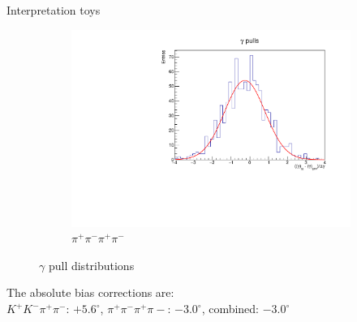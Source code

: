 \documentclass{beamer}
\begin{document}
\begin{frame}{Interpretation toys}
\begin{figure}
\begin{subfigure}{0.5\textwidth}
      \includegraphics[width=1.0\textwidth]{Plots/gamma_pull_toys_pipipipi.pdf}
      \vspace{-0.3cm}
      \caption*{$\pi^+\pi^-\pi^+\pi^-$}
    \end{subfigure}
    \vspace{-0.5cm}
    \caption*{$\gamma$ pull distributions}
  \end{figure}
  \vspace{-0.3cm}
  \begin{center}
    The absolute bias corrections are:\\
    $K^+K^-\pi^+\pi^-$: $+5.6^\circ$, $\pi^+\pi^-\pi^+\pi-$: $-3.0^\circ$, combined: $-3.0^\circ$
  \end{center}
\end{frame}
\end{document}
